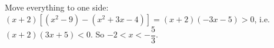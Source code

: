 Move everything to one side: $(x+2)\left[\left(x^2-9\right)-\left(x^2+3x-4\right)\right]=(x+2)(-3x-5)>0$, i.e. $(x+2)(3x+5)<0$. So $\boxed{-2<x<-\dfrac53}$.
